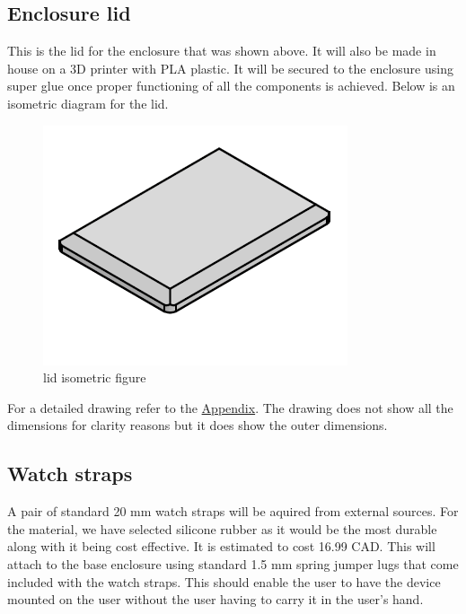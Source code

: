 \documentclass[12pt, titlepage]{article}
\begin{document}
\subsection{Enclosure lid}
This is the lid for the enclosure that was shown above. It will also be made in house on a 3D printer with PLA plastic. It will be secured to the enclosure using super glue once proper functioning of all the components is achieved. 
Below is an isometric diagram for the lid.\\
\begin{figure}[H]
  \vspace*{-0.5cm}
  \centering
  \includegraphics[width=\textwidth,height=\textheight/2,keepaspectratio]{Lid_ISO.png}
  \vspace*{-2cm}
  \caption{lid isometric figure}
  \label{Lid ISO} 
\end{figure}
 For a detailed drawing refer to the \hyperref[appendix:hardware:lidDWG]{Appendix}. The drawing does not show all the dimensions for clarity reasons but it does show the outer dimensions.

\subsection{Watch straps}
A pair of standard 20 mm watch straps will be aquired from external sources. For the material, we have selected silicone rubber as it would be the most durable along with it being cost effective. It is estimated to cost 16.99 CAD. This will attach to the base enclosure using standard 1.5 mm spring jumper lugs that come included with the watch straps. This should enable the user to have the device mounted on the user without the user having to carry it in the user's hand.
\end{document}
